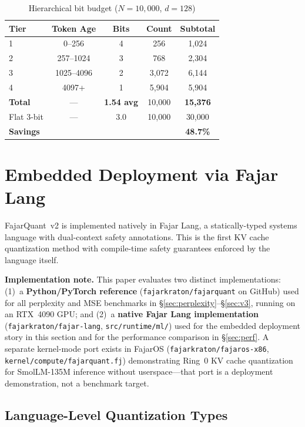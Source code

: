 \documentclass[10pt,twocolumn]{article}
\begin{document}
\begin{table}[t]
\centering
\small
\caption{Hierarchical bit budget ($N{=}10{,}000$, $d{=}128$)}
\label{tab:budget}
\setlength{\tabcolsep}{5pt}
\begin{tabular}{lcccc}
\toprule
Tier & Token Age & Bits & Count & Subtotal \\
\midrule
1 & 0--256 & 4 & 256 & 1,024 \\
2 & 257--1024 & 3 & 768 & 2,304 \\
3 & 1025--4096 & 2 & 3,072 & 6,144 \\
4 & 4097+ & 1 & 5,904 & 5,904 \\
\midrule
\textbf{Total} & --- & \textbf{1.54 avg} & 10,000 & \textbf{15,376} \\
Flat 3-bit & --- & 3.0 & 10,000 & 30,000 \\
\textbf{Savings} & & & & \textbf{48.7\%} \\
\bottomrule
\end{tabular}
\end{table}

\section{Embedded Deployment via Fajar Lang}
\label{sec:embedded}

FajarQuant~v2 is implemented natively in Fajar Lang, a statically-typed
systems language with dual-context safety annotations. This is the first
KV cache quantization method with compile-time safety guarantees
enforced by the language itself.

\textbf{Implementation note.} This paper evaluates two distinct
implementations: (1)~a \textbf{Python/PyTorch reference}
(\texttt{fajarkraton/fajarquant} on GitHub) used for all perplexity
and MSE benchmarks in \S\ref{sec:perplexity}--\S\ref{sec:v3},
running on an RTX~4090 GPU; and (2)~a \textbf{native Fajar Lang
implementation} (\texttt{fajarkraton/fajar-lang}, \texttt{src/runtime/ml/})
used for the embedded deployment story in this section and for the
performance comparison in \S\ref{sec:perf}. A separate kernel-mode port
exists in FajarOS (\texttt{fajarkraton/fajaros-x86},
\texttt{kernel/compute/fajarquant.fj}) demonstrating Ring~0 KV cache
quantization for SmolLM-135M inference without userspace---that port is
a deployment demonstration, not a benchmark target.

\subsection{Language-Level Quantization Types}
\end{document}
